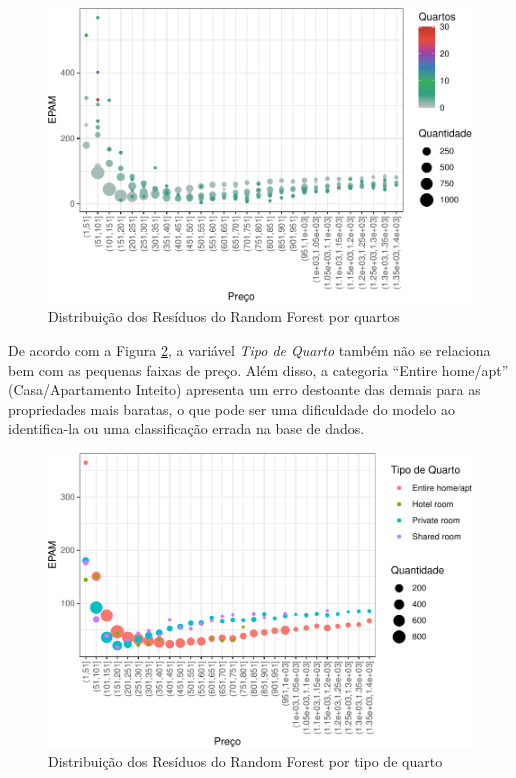 \documentclass[
	12pt,				%
	a4paper,		%
	oneside,    %
	chapter=TITLE,		   %
	section=TITLE,		   %
	subsection=TITLE,	   %
	subsubsection=TITLE, %
	english,			%
	french,				%
	spanish,			%
	brazil,				%
]{abntex2}
\begin{document}
\begin{figure}
\centering
\includegraphics{00-TCC_files/figure-latex/unnamed-chunk-42-1.pdf}
\caption{\label{graf_resid_rf_quartos}Distribuição dos Resíduos do
Random Forest por quartos}
\end{figure}

De acordo com a Figura \ref{graf_resid_rf_tp_quarto}, a variável
\emph{Tipo de Quarto} também não se relaciona bem com as pequenas faixas
de preço. Além disso, a categoria ``Entire home/apt'' (Casa/Apartamento
Inteito) apresenta um erro destoante das demais para as propriedades
mais baratas, o que pode ser uma dificuldade do modelo ao identifica-la
ou uma classificação errada na base de dados.

\begin{figure}
\centering
\includegraphics{00-TCC_files/figure-latex/graf_resid_rf_tp_quarto-1.pdf}
\caption{\label{graf_resid_rf_tp_quarto}Distribuição dos Resíduos do
Random Forest por tipo de quarto}
\end{figure}
\end{document}
